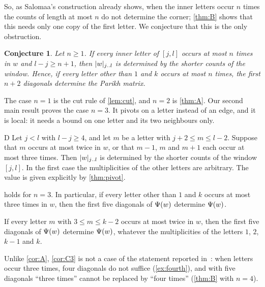 \documentclass[11pt,a4paper]{article}
\newtheorem{mainconj}{Conjecture}
\begin{document}
So, as Salomaa's construction already shows, when the inner letters occur $n$ times the counts of length at most $n$ do not determine the corner; \cref{thm:B} shows that this needs only one copy of the first letter. We conjecture that this is the only obstruction.

\begin{mainconj}\label{conj:C}
Let $n\ge1$. If every inner letter of $[j,l]$ occurs at most $n$ times in $w$ and $l-j\ge n+1$, then $\lvert w\rvert_{j\mathinner{\ldotp\ldotp} l}$ is determined by the shorter counts of the window. Hence, if every letter other than $1$ and $k$ occurs at most $n$ times, the first $n+2$ diagonals determine the Parikh matrix.
\end{mainconj}

The case $n=1$ is the cut rule of \cref{lem:cut}, and $n=2$ is \cref{thm:A}. Our second main result proves the case $n=3$. It pivots on a letter instead of an edge, and it is local: it needs a bound on one letter and its two neighbours only.

\begin{maintheorem}{D}\label{thm:D}
Let $j<l$ with $l-j\ge4$, and let $m$ be a letter with $j+2\le m\le l-2$. Suppose that $m$ occurs at most twice in $w$, or that $m-1$, $m$ and $m+1$ each occur at most three times. Then $\lvert w\rvert_{j\mathinner{\ldotp\ldotp} l}$ is determined by the shorter counts of the window $[j,l]$. In the first case the multiplicities of the other letters are arbitrary. The value is given explicitly by \cref{thm:pivot}.
\end{maintheorem}

\begin{corollary}\label{cor:C3}
 holds for $n=3$. In particular, if every letter other than $1$ and $k$ occurs at most three times in $w$, then the first five diagonals of $\Psi(w)$ determine $\Psi(w)$.
\end{corollary}

\begin{corollary}\label{cor:D2}
If every letter $m$ with $3\le m\le k-2$ occurs at most twice in $w$, then the first five diagonals of $\Psi(w)$ determine $\Psi(w)$, whatever the multiplicities of the letters $1$, $2$, $k-1$ and $k$.
\end{corollary}

Unlike \cref{cor:A}, \cref{cor:C3} is not a case of the statement reported in~\cite[p.~228]{Sal06}: when letters occur three times, four diagonals do not suffice (\cref{ex:fourth}), and with five diagonals ``three times'' cannot be replaced by ``four times'' (\cref{thm:B} with $n=4$).
\end{document}
